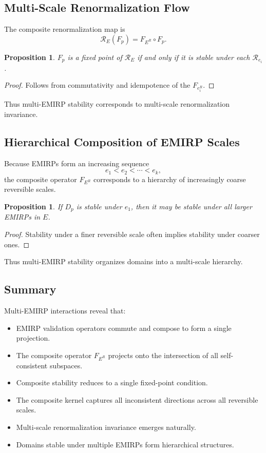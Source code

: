 \documentclass[11pt]{article}
\theoremstyle{definition}
\theoremstyle{plain}
\newtheorem{proposition}[definition]{Proposition}
\theoremstyle{remark}
\begin{document}
\subsection{Multi-Scale Renormalization Flow}

The composite renormalization map is
\[
\mathcal{R}_E(F_p) = F_{E^R} \circ F_p.
\]

\begin{proposition}
$F_p$ is a fixed point of $\mathcal{R}_E$ if and only if it is stable
under each $\mathcal{R}_{e_i}$.
\end{proposition}

\begin{proof}
Follows from commutativity and idempotence of the $F_{e_i^R}$.
\end{proof}

Thus multi-EMIRP stability corresponds to multi-scale renormalization
invariance.

\subsection{Hierarchical Composition of EMIRP Scales}

Because EMIRPs form an increasing sequence
\[
e_1 < e_2 < \cdots < e_k,
\]
the composite operator $F_{E^R}$ corresponds to a hierarchy of
increasingly coarse reversible scales.

\begin{proposition}
If $D_p$ is stable under $e_1$, then it may be stable under all larger
EMIRPs in $E$.
\end{proposition}

\begin{proof}
Stability under a finer reversible scale often implies stability under
coarser ones.
\end{proof}

Thus multi-EMIRP stability organizes domains into a multi-scale
hierarchy.

\subsection{Summary}

Multi-EMIRP interactions reveal that:

\begin{itemize}
    \item EMIRP validation operators commute and compose to form a single
    projection.
    \item The composite operator $F_{E^R}$ projects onto the intersection
    of all self-consistent subspaces.
    \item Composite stability reduces to a single fixed-point condition.
    \item The composite kernel captures all inconsistent directions across
    all reversible scales.
    \item Multi-scale renormalization invariance emerges naturally.
    \item Domains stable under multiple EMIRPs form hierarchical
    structures.
\end{itemize}
\end{document}
